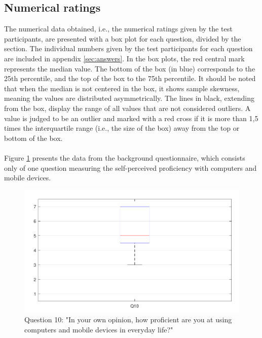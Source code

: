 \documentclass[english, 12pt, a4paper, pdftex, elec, utf8]{aaltothesis}
\begin{document}
\subsection{Numerical ratings} \label{sec:numerical}

The numerical data obtained, i.e., the numerical ratings given by the test participants, are presented with a box plot for each question, divided by the section. The individual numbers given by the test participants for each question are included in appendix \ref{sec:answers}. In the box plots, the red central mark represents the median value. The bottom of the box (in blue) corresponds to the 25th percentile, and the top of the box to the 75th percentile. It should be noted that when the median is not centered in the box, it shows sample skewness, meaning the values are distributed asymmetrically. The lines in black, extending from the box, display the range of all values that are not considered outliers. A value is judged to be an outlier and marked with a red cross if it is more than 1,5 times the interquartile range (i.e., the size of the box) away from the top or bottom of the box. \cite{boxplot} \\\\
Figure \ref{fig:results1} presents the data from the background questionnaire, which consists only of one question measuring the self-perceived proficiency with computers and mobile devices.
\begin{figure}[t]
    \centering
    \includegraphics[width=\textwidth]{T2_box1.pdf}
    \caption{Question 10: "In your own opinion, how proficient are you at using computers and mobile devices in everyday life?"}
    \label{fig:results1}
\end{figure}
\end{document}
